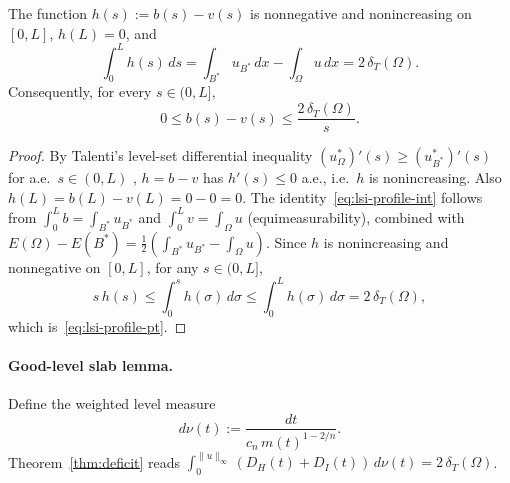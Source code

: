 \begin{lemma}\label{lem:profile-gap}
The function $h(s):=b(s)-v(s)$ is nonnegative and nonincreasing on
$[0,L]$, $h(L)=0$, and
\begin{equation}\label{eq:lsi-profile-int}
   \int_{0}^{L}h(s)\,ds
   =\int_{B^{*}}u_{B^{*}}\,dx-\int_{\Omega}u\,dx
   =2\,\delta_{T}(\Omega).
\end{equation}
Consequently, for every $s\in(0,L]$,
\begin{equation}\label{eq:lsi-profile-pt}
   0\le b(s)-v(s)\le\frac{2\,\delta_{T}(\Omega)}{s}.
\end{equation}
\end{lemma}

\begin{proof}
By Talenti's level-set differential inequality
$(u_{\Omega}^{*})'(s)\ge(u_{B^{*}}^{*})'(s)$ for a.e.\ $s\in(0,L)$
\cite[Theorem 1, (3.6)]{Talenti1976}, $h=b-v$ has $h'(s)\le 0$ a.e.,
i.e.\ $h$ is nonincreasing. Also $h(L)=b(L)-v(L)=0-0=0$. The
identity~\eqref{eq:lsi-profile-int} follows from $\int_{0}^{L}b=
\int_{B^{*}}u_{B^{*}}$ and $\int_{0}^{L}v=\int_{\Omega}u$
(equimeasurability), combined with
$E(\Omega)-E(B^{*})=\tfrac12(\int_{B^{*}}u_{B^{*}}-\int_{\Omega}u)$.
Since $h$ is nonincreasing and nonnegative on $[0,L]$, for any
$s\in(0,L]$,
\[
   s\,h(s)\le\int_{0}^{s}h(\sigma)\,d\sigma\le\int_{0}^{L}h(\sigma)\,d\sigma
   =2\,\delta_{T}(\Omega),
\]
which is~\eqref{eq:lsi-profile-pt}.
\end{proof}

\paragraph{Good-level slab lemma.} Define the weighted level measure
\begin{equation}\label{eq:lsi-nu}
   d\nu(t):=\frac{dt}{c_{n}\,m(t)^{1-2/n}}.
\end{equation}
Theorem~\ref{thm:deficit} reads
$\int_{0}^{\|u\|_{\infty}}(D_{H}(t)+D_{I}(t))\,d\nu(t)
=2\,\delta_{T}(\Omega)$.

